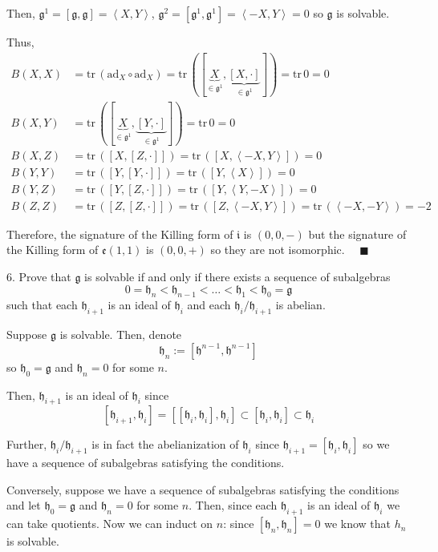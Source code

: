 \documentclass[12pt]{article}
\newcommand{\g}{\mathfrak{g}}
\newcommand{\h}{\mathfrak{h}}
\newcommand{\brak}[1]{\left\langle #1 \right\rangle}
\newcommand{\ad}{\text{ad}}
\newcommand{\tr}{\text{tr}\,}
\newcommand{\qed}{\quad \blacksquare}
\begin{document}
        Then, $\g^1 = [\g, \g] = \brak{X, Y}$, $\g^2 = [\g^1, \g^1] = \brak{-X, Y} = 0$ so $\g$ is solvable. 

        Thus, 
        \begin{align*}
            B(X, X) &= \tr(\ad_X \circ \ad_X) = \tr([\underbrace{X}_{\in \g^1}, \underbrace{[X, \cdot]}_{\in \g^1}]) = \tr 0 = 0\\ 
            B(X, Y) &= \tr([\underbrace{X}_{\in \g^1}, \underbrace{[Y, \cdot]}_{\in \g^1}]) = \tr 0 = 0\\ 
            B(X, Z) &= \tr([X, [Z, \cdot]]) = \tr([X, \brak{-X, Y}]) = 0\\ 
            B(Y, Y) &= \tr([Y, [Y, \cdot]]) = \tr([Y, \brak{X}]) = 0\\ 
            B(Y, Z) &= \tr([Y, [Z, \cdot]]) = \tr([Y, \brak{Y, -X}]) = 0\\
            B(Z, Z) &= \tr([Z, [Z, \cdot]]) = \tr([Z, \brak{-X, Y}]) = \tr(\brak{-X, -Y}) = -2
        \end{align*}

        Therefore, the signature of the Killing form of $\mathfrak{i}$ is $(0, 0, -)$ but the signature of the Killing form of $\mathfrak{e}(1, 1)$ is $(0, 0, +)$ so they are not isomorphic. $\qed$ 
    \color{black}
\pagebreak

6.  Prove that $\g$ is solvable if and only if there exists a sequence of subalgebras 
\begin{equation}\label{eq2}
0 = \h_{n} < \h_{n-1} < \hdots < \h_{1} < \h_{0} = \g
\end{equation}
such that each $\h_{i+1}$ is an ideal of $\h_{i}$ and each $\h_{i}/\h_{i+1}$ is abelian.

    \color{blue}
        Suppose $\g$ is solvable. Then, denote 
        \[\h_n := [\h^{n-1}, \h^{n-1}]\]
        so $\h_0 = \g$ and $\h_n = 0$ for some $n$. 

        Then, $\h_{i+1}$ is an ideal of $\h_i$ since 
        \[[\h_{i+1}, \h_i] = [[\h_i, \h_i], \h_i] \subset [\h_i, \h_i] \subset \h_i\]
        
        Further, $\h_i/\h_{i+1}$ is in fact the abelianization of $\h_i$ since $\h_{i+1} = [\h_i, \h_i]$ so we have a sequence of subalgebras satisfying the conditions.

        Conversely, suppose we have a sequence of subalgebras satisfying the conditions and let $\h_0 = \g$ and $\h_n = 0$ for some $n$. Then, since each $\h_{i+1}$ is an ideal of $\h_i$ we can take quotients. Now we can induct on $n$: since $[\h_n, \h_n] = 0$ we know that $h_n$ is solvable. 
\end{document}
